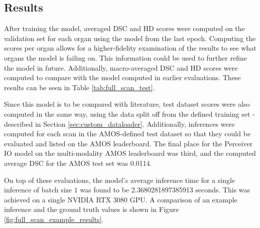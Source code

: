 \documentclass{l4proj}
\begin{document}
\subsection{Results}

After training the model, averaged DSC and HD scores were computed on the validation set for each organ using the model from the last epoch. Computing the scores per organ allows for a higher-fidelity examination of the results to see what organs the model is failing on. This information could be used to further refine the model in future. Additionally, macro-averaged DSC and HD scores were computed to compare with the model computed in earlier evaluations. These results can be seen in Table \ref{tab:full_scan_test}.

Since this model is to be compared with literature, test dataset scores were also computed in the same way, using the data split off from the defined training set - described in Section \ref{sec:custom_dataloader}. Additionally, inferences were computed for each scan in the AMOS-defined test dataset so that they could be evaluated and listed on the AMOS leaderboard. The final place for the Perceiver IO model on the multi-modality AMOS leaderboard was third, and the computed average DSC for the AMOS test set was \num{0.0114}.

On top of these evaluations, the model’s average inference time for a single inference of batch size $1$ was found to be \num{2.3680281897385913} seconds. This was achieved on a single NVIDIA RTX 3080 GPU. A comparison of an example inference and the ground truth values is shown in Figure \ref{fig:full_scan_example_results}.
\end{document}
